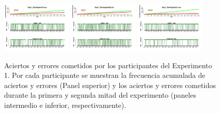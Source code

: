 \begin{figure}[th]
\includegraphics[width=0.30\textwidth]{Figures/Success_Exp1_P19} \includegraphics[width=0.30\textwidth]{Figures/Success_Exp1_P20} \includegraphics[width=0.30\textwidth]{Figures/Success_Exp1_P21} 
\caption[Aciertos y Errores a lo largo del tiempo; Experimento 1]{Aciertos y errores cometidos por los participantes del Experimento 1. Por cada participante se muestran la frecuencia acumulada de aciertos y errores (Panel superior) y los aciertos y errores cometidos durante la primera y segunda mitad del experimento (paneles intermedio e inferior, respectivamente).}
\label{fig:Success_E1}
\end{figure}

